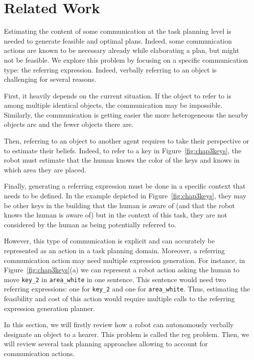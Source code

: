 \documentclass[a4paper,11pt,twoside]{StyleThese}
\begin{document}
\section{Related Work}
Estimating the content of some communication at the task planning level is needed to generate feasible and optimal plans. Indeed, some communication actions are known to be necessary already while elaborating a plan, but might not be feasible. We explore this problem by focusing on a specific communication type: the referring expression. Indeed, verbally referring to an object is challenging for several reasons. 

First, it heavily depends on the current situation. If the object to refer to is among multiple identical objects, the communication may be impossible. Similarly, the communication is getting easier the more heterogeneous the nearby objects are and the fewer objects there are. 

Then, referring to an object to another agent requires to take their perspective or to estimate their beliefs. Indeed, to refer to a key in Figure~\ref{fig:chap3keys}, the robot must estimate that the human knows the color of the keys and knows in which area they are placed.

Finally, generating a referring expression must be done in a specific context that needs to be defined. In the example depicted in Figure~\ref{fig:chap3keys}, they may be other keys in the building that the human is aware of (and that the robot knows the human is aware of) but in the context of this task, they are not considered by the human as being potentially referred to.

However, this type of communication is explicit and can accurately be represented as an action in a task planning domain. Moreover, a referring communication action may need multiple expression generation. For instance, in Figure~\ref{fig:chap3keys}(a) we can represent a robot action asking the human to move \verb'key_2' in \verb'area_white' in one sentence. This sentence would need two referring expressions: one for \verb'key_2' and one for \verb'area_white'. Thus, estimating the feasibility and cost of this action would require multiple calls to the referring expression generation planner.

In this section, we will firstly review how a robot can autonomously verbally designate an object to a hearer. This problem is called the \acrfull{reg} problem.
Then, we will review several task planning approaches allowing to account for communication actions.
\end{document}
